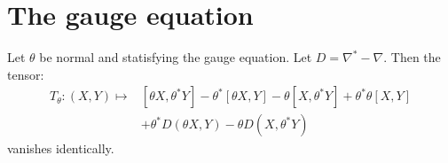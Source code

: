 \section{The gauge equation}
\begin{prop}
    \label{prop:gen_nijenhuis}
    Let $\theta$ be normal and statisfying the gauge equation. Let $D=\nabla^*-\nabla$. Then the tensor:
    \begin{equation}
        \label{eq:gen_nijenhuis}
        \begin{split}
        T_\theta \colon (X,Y) \mapsto & \left[ \theta X, \theta^*Y \right] - \theta^* \left[ \theta X, Y \right] 
        - \theta \left[X, \theta^*Y  \right] + \theta^* \theta \left[ X,Y \right]\\
        & +\theta^* D\left( \theta X, Y \right) - \theta D\left( X, \theta^*Y \right)
        \end{split}
    \end{equation}
    vanishes identically.
\end{prop} 
